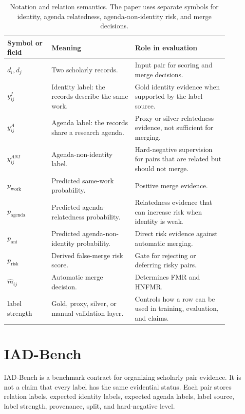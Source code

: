 \documentclass[preprint,12pt]{elsarticle}
\begin{document}
\begin{table}[H]
\caption{Notation and relation semantics. The paper uses separate symbols for identity, agenda relatedness, agenda-non-identity risk, and merge decisions.}
\label{tab:notation}
\centering
\small
\begin{tabular}{L{0.18\linewidth}L{0.34\linewidth}L{0.38\linewidth}}
\toprule
Symbol or field & Meaning & Role in evaluation \\
\midrule
$d_i,d_j$ & Two scholarly records. & Input pair for scoring and merge decisions. \\
$y^I_{ij}$ & Identity label: the records describe the same work. & Gold identity evidence when supported by the label source. \\
$y^A_{ij}$ & Agenda label: the records share a research agenda. & Proxy or silver relatedness evidence, not sufficient for merging. \\
$y^{ANI}_{ij}$ & Agenda-non-identity label. & Hard-negative supervision for pairs that are related but should not merge. \\
$p_{\mathrm{work}}$ & Predicted same-work probability. & Positive merge evidence. \\
$p_{\mathrm{agenda}}$ & Predicted agenda-relatedness probability. & Relatedness evidence that can increase risk when identity is weak. \\
$p_{\mathrm{ani}}$ & Predicted agenda-non-identity probability. & Direct risk evidence against automatic merging. \\
$p_{\mathrm{risk}}$ & Derived false-merge risk score. & Gate for rejecting or deferring risky pairs. \\
$\hat{m}_{ij}$ & Automatic merge decision. & Determines FMR and HNFMR. \\
label strength & Gold, proxy, silver, or manual validation layer. & Controls how a row can be used in training, evaluation, and claims. \\
\bottomrule
\end{tabular}
\end{table}

\section{IAD-Bench}

IAD-Bench is a benchmark contract for organizing scholarly pair evidence. It is not a claim that every label has the same evidential status. Each pair stores relation labels, expected identity labels, expected agenda labels, label source, label strength, provenance, split, and hard-negative level.
\end{document}
